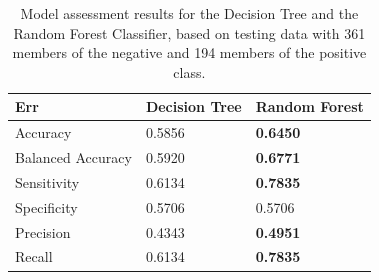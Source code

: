 \documentclass{article}
\begin{document}
  \begin{table}[]
    \begin{tabular}{l|l|l}
      \textbf{Err}      & \textbf{Decision Tree} & \textbf{Random Forest} \\ \hline
      Accuracy          & 0.5856                 & \textbf{0.6450}        \\
      Balanced Accuracy & 0.5920                 & \textbf{0.6771}        \\
      Sensitivity       & 0.6134                 & \textbf{0.7835}        \\
      Specificity       & 0.5706                 & 0.5706                 \\
      Precision         & 0.4343                 & \textbf{0.4951}        \\
      Recall            & 0.6134                 & \textbf{0.7835}       
    \end{tabular}
    \caption{Model assessment results for the Decision Tree and the Random Forest Classifier, based on testing data with 361 members of the negative and 194 members of the positive class.}
    \label{tab:Err}
  \end{table}

  
\end{document}

